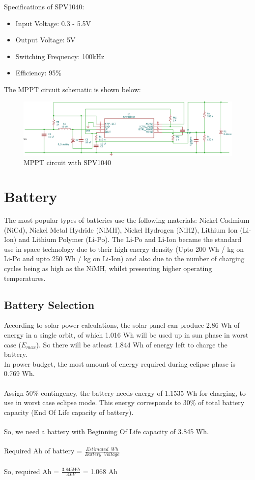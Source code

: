Specifications of  SPV1040:
	\begin{itemize}
	\item Input Voltage: 0.3 - 5.5V
	\item Output Voltage: 5V
	\item Switching Frequency: 100kHz
	\item Efficiency: 95\%
\end{itemize}
The MPPT circuit schematic is shown below:
 	\begin{figure}[ht]
	\centering
	\includegraphics[width=\columnwidth]{mppt.pdf}
	\caption{MPPT circuit with SPV1040}
	\label{fig:mpptsch}
\end{figure}

\section[Battery]{Battery}
The most popular types of batteries use the following materials: Nickel Cadmium
(NiCd), Nickel Metal Hydride (NiMH), Nickel Hydrogen (NiH2), Lithium Ion
(Li-Ion) and Lithium Polymer (Li-Po). The Li-Po and Li-Ion became the standard use in space technology due to their
high energy density (Upto 200 Wh / kg on Li-Po and upto 250 Wh / kg on Li-Ion) and also due to
the number of charging cycles being as high as the NiMH, whilst presenting higher
operating temperatures. 
\subsection{Battery Selection}
According to solar power calculations, the solar panel can produce 2.86 Wh of energy in a single orbit, of which 1.016 Wh will be used up in sun phase in worst case ($E_{max}$). So there will be atleast 1.844 Wh of energy left to charge the battery.\\
In power budget, the most amount of energy required during eclipse phase is 0.769 Wh.\\ \\
Assign 50\% contingency, the battery needs energy of 1.1535 Wh for charging, to use in worst case eclipse mode. This energy corresponds to 30\% of total battery capacity (End Of Life capacity of battery).\\ \\
So, we need a battery with Beginning Of Life capacity of 3.845 Wh.\\ \\
\hspace*{5cm}Required Ah of battery = $\frac{Estimated\;\; Wh}{Battery\;\; Voltage}$
\\ \\ \hspace*{5cm}So, required Ah = $\frac{3.845 Wh}{3.6 V}$ = 1.068 Ah\\


